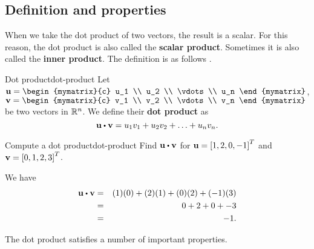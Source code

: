 \subsection{Definition and properties}

When we take the dot product of two vectors, the result is a
scalar. For this reason, the dot product is also called the
\textbf{scalar product}. Sometimes it is also called the \textbf{inner
  product}. The definition is as follows%
%
%
%
.

\begin{definition}{Dot product}{dot-product}
  Let $\vect{u}=\begin{mymatrix}{c}
    u_1 \\
    u_2 \\
    \vdots \\
    u_n
  \end{mymatrix}$, $\vect{v}= \begin{mymatrix}{c}
    v_1 \\
    v_2 \\
    \vdots \\
    v_n
  \end{mymatrix}$ be two vectors in $\mathbb{R}^n$. We
  define their \textbf{dot product} as
  \begin{equation*}
    \vect{u}\dotprod \vect{v} = u_1v_1+u_2v_2+\ldots+u_nv_n.
  \end{equation*}
\end{definition}

\begin{example}{Compute a dot product}{dot-product}
  Find $\vect{u} \dotprod \vect{v}$ for $\vect{u}=\mat{1,2,0,-1}^T$
  and $\vect{v}=\mat{0,1,2,3}^T$.
\end{example}

\begin{solution}
  We have
  \begin{eqnarray*}
    \vect{u} \dotprod \vect{v}
    &=&
        (1)(0) + (2)(1) + (0)(2) + (-1)(3) \\
    &=&
        0 + 2 + 0 + -3 \\
    &=&
        -1.
  \end{eqnarray*}
\end{solution}

The dot product satisfies a number of important properties.

